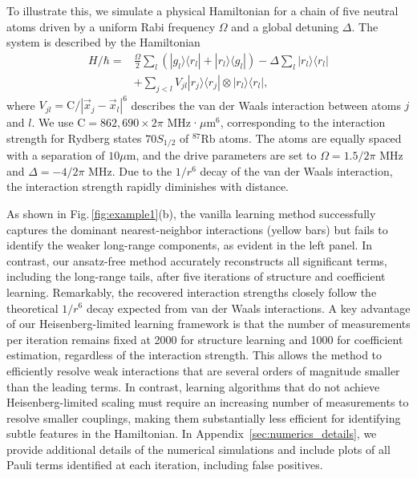 \documentclass[twocolumn,superscriptaddress,aps,showpacs,amsmath,amstex,amssymb,citeautoscript,floatfix,pra,preprintnumbers]{revtex4-2}
\newcounter{alg}
\theoremstyle{plain}
\theoremstyle{plain}
\theoremstyle{plain}
\theoremstyle{plain}
\theoremstyle{plain}
\theoremstyle{plain}
\newcommand{\eqs}[1]{\begin{equation}\begin{split}#1\end{split}\end{equation}}
\newcommand{\figref}[1]{Fig.\,\ref{#1}}
\begin{document}
 To illustrate this, we simulate a physical Hamiltonian for a chain of five neutral atoms driven by a uniform Rabi frequency $\Omega$ and a global detuning $\Delta$. The system is described by the Hamiltonian
\eqs{
H/\hbar = &\frac{\Omega}{2} \sum_{l} \left( |g_l\rangle \langle r_l| + |r_l\rangle \langle g_l| \right) - \Delta \sum_{l} |r_l\rangle \langle r_l| \\
&+ \sum_{j<l} V_{jl} |r_j\rangle \langle r_j| \otimes |r_l\rangle \langle r_l| ,
}
where $V_{jl} = \mathrm{C} / |\vec{x}_j - \vec{x}_l|^6$ describes the van der Waals interaction between atoms $j$ and $l$. We use $\mathrm{C} = 862{,}690 \times 2\pi$ MHz·$\mu$m$^6$, corresponding to the interaction strength for Rydberg states $70S_{1/2}$ of $^{87}\text{Rb}$ atoms. The atoms are equally spaced with a separation of $10\mu\text{m}$, and the drive parameters are set to $\Omega = 1.5/2\pi$ MHz and $\Delta = -4/2\pi$ MHz. Due to the $1/r^6$ decay of the van der Waals interaction, the interaction strength rapidly diminishes with distance.

As shown in \figref{fig:example1}(b), the vanilla learning method successfully captures the dominant nearest-neighbor interactions (yellow bars) but fails to identify the weaker long-range components, as evident in the left panel. In contrast, our ansatz-free method accurately reconstructs all significant terms, including the long-range tails, after five iterations of structure and coefficient learning. Remarkably, the recovered interaction strengths closely follow the theoretical $1/r^6$ decay expected from van der Waals interactions. A key advantage of our Heisenberg-limited learning framework is that the number of measurements per iteration remains fixed at 2000 for structure learning and 1000 for coefficient estimation, regardless of the interaction strength. This allows the method to efficiently resolve weak interactions that are several orders of magnitude smaller than the leading terms. In contrast, learning algorithms that do not achieve Heisenberg-limited scaling must require an increasing number of measurements to resolve smaller couplings, making them substantially less efficient for identifying subtle features in the Hamiltonian. In Appendix~\ref{sec:numerics_details}, we provide additional details of the numerical simulations and include plots of all Pauli terms identified at each iteration, including false positives.
\end{document}
